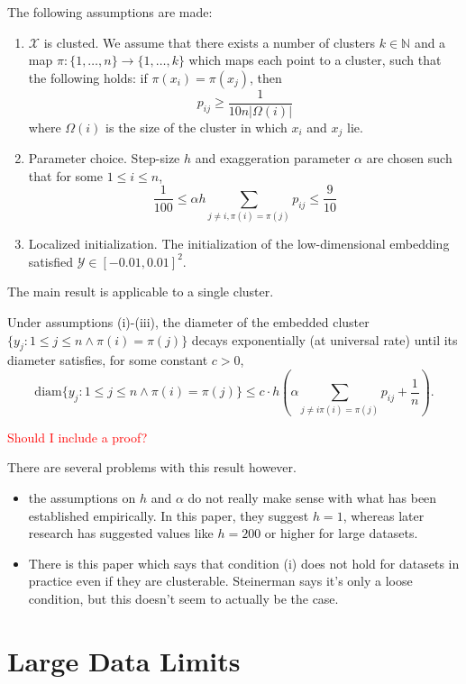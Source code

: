 The following assumptions are made: 
\begin{enumerate}
    \item $\mathcal{X}$ is clusted. We assume that there exists a number of clusters $k \in \mathbb{N}$ and a map $\pi: \{1,\dots,n\} \to \{1,\dots,k\}$ which maps each point to a cluster, such that the following holds: if $\pi(x_i) = \pi(x_j)$, then \begin{equation}
        p_{ij} \geq \frac{1}{10 n |\Omega(i)|}
    \end{equation}
    where $\Omega(i)$ is the size of the cluster in which $x_i$ and $x_j$ lie. 
    \item Parameter choice. Step-size $h$ and exaggeration parameter $\alpha$ are chosen such that for some $1\leq i \leq n$, 
    \begin{equation}
        \frac{1}{100} \leq \alpha h \sum_{j \neq i, \pi(i) = \pi(j)} p_{ij} \leq \frac{9}{10}
    \end{equation}
    \item Localized initialization. The initialization of the low-dimensional embedding satisfied $\mathcal{Y} \in [-0.01, 0.01]^2$. 
\end{enumerate}
The main result is applicable to a single cluster. 

\begin{thm}
    Under assumptions (i)-(iii), the diameter of the embedded cluster $\{y_j: 1 \leq j \leq n \land \pi(i) = \pi(j)\}$ decays exponentially (at universal rate) until its diameter satisfies, for some constant $c > 0$,
    \begin{equation}
        \text{diam} \{y_j: 1 \leq j \leq n \land \pi(i) = \pi(j)\} \leq c \cdot h \left(\alpha \sum_{j \neq i \pi(i) = \pi(j)} p_{ij} + \frac{1}{n} \right). 
    \end{equation}
\end{thm}
\textcolor{red}{Should I include a proof?}

There are several problems with this result however. 
\begin{itemize}
    \item the assumptions on $h$ and $\alpha$ do not really make sense with what has been established empirically. In this paper, they suggest $h=1$, whereas later research has suggested values like $h=200$ or higher for large datasets. 
    \item There is this paper which says that condition (i) does not hold for datasets in practice even if they are clusterable. Steinerman says it's only a loose condition, but this doesn't seem to actually be the case. 
\end{itemize}
\section{Large Data Limits}
